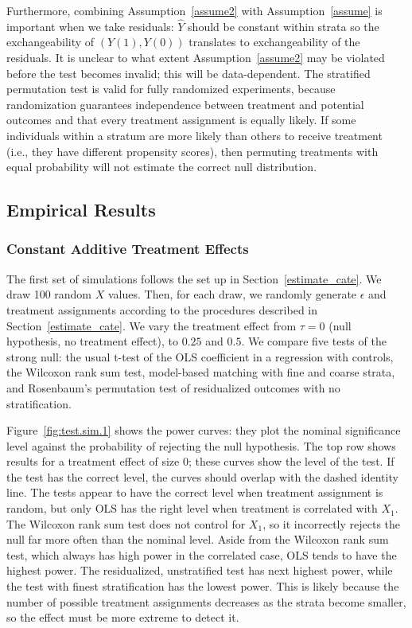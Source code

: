 \documentclass[12pt]{article}
\begin{document}
Furthermore, combining Assumption~\ref{assume2} with Assumption~\ref{assume} is important when we take residuals: $\hat{Y}$ should be constant within strata so the exchangeability of $(Y(1), Y(0))$ translates to exchangeability of the residuals.
It is unclear to what extent Assumption~\ref{assume2} may be violated before the test becomes invalid; this will be data-dependent.
The stratified permutation test is valid for fully randomized experiments, because randomization guarantees independence between treatment and potential outcomes
and that every treatment assignment is equally likely.
If some individuals within a stratum are more likely than others to receive treatment (i.e., they have different propensity scores), then permuting treatments with equal probability will not estimate the correct null distribution. 


\subsection{Empirical Results}
\subsubsection{Constant Additive Treatment Effects}
The first set of simulations follows the set up in Section~\ref{estimate_cate}.
We draw 100 random $X$ values.
Then, for each draw, we randomly generate $\epsilon$ and treatment assignments according to the procedures described in Section~\ref{estimate_cate}.
We vary the treatment effect from $\tau=0$ (null hypothesis, no treatment effect), to $0.25$ and $0.5$.
We compare five tests of the strong null: the usual t-test of the OLS coefficient in a regression with controls, the Wilcoxon rank sum test, 
model-based matching with fine and coarse strata, and Rosenbaum's permutation test of residualized outcomes with no stratification.

Figure~\ref{fig:test.sim.1} shows the power curves: they plot the nominal significance level against the probability of rejecting the null hypothesis.
The top row shows results for a treatment effect of size $0$; these curves show the level of the test.
If the test has the correct level, the curves should overlap with the dashed identity line.
The tests appear to have the correct level when treatment assignment is random, but only OLS has the right level when treatment is correlated with $X_1$.
The Wilcoxon rank sum test does not control for $X_1$, so it incorrectly rejects the null far more often than the nominal level.
Aside from the Wilcoxon rank sum test, which always has high power in the correlated case, OLS tends to have the highest power.
The residualized, unstratified test has next highest power, while the test with finest stratification has the lowest power.
This is likely because the number of possible treatment assignments decreases as the strata become smaller, so the effect must be more extreme to detect it.
\end{document}
